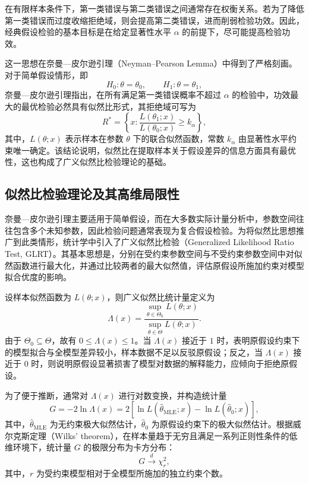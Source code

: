 \documentclass[UTF8,a4paper,12pt]{ctexbook}
\begin{document}
在有限样本条件下，第一类错误与第二类错误之间通常存在权衡关系。若为了降低第一类错误而过度收缩拒绝域，则会提高第二类错误，进而削弱检验功效。因此，经典假设检验的基本目标是在给定显著性水平 $\alpha$ 的前提下，尽可能提高检验功效。

这一思想在奈曼—皮尔逊引理（Neyman--Pearson Lemma）中得到了严格刻画。对于简单假设情形，即
\begin{equation}
H_0:\theta=\theta_0, \qquad H_1:\theta=\theta_1,
\end{equation}
奈曼—皮尔逊引理指出，在所有满足第一类错误概率不超过 $\alpha$ 的检验中，功效最大的最优检验必然具有似然比形式，其拒绝域可写为
\begin{equation}
R^*=\left\{x:\frac{L(\theta_1;x)}{L(\theta_0;x)}\geq k_{\alpha}\right\},
\end{equation}
其中，$L(\theta;x)$ 表示样本在参数 $\theta$ 下的联合似然函数，常数 $k_{\alpha}$ 由显著性水平约束唯一确定。该结论说明，似然比在提取样本关于假设差异的信息方面具有最优性，这也构成了广义似然比检验理论的基础。

\subsection{似然比检验理论及其高维局限性}

奈曼—皮尔逊引理主要适用于简单假设，而在大多数实际计量分析中，参数空间往往包含多个未知参数，因此检验问题通常表现为复合假设检验。为将似然比思想推广到此类情形，统计学中引入了广义似然比检验（Generalized Likelihood Ratio Test, GLRT）。其基本思想是，分别在受约束参数空间与不受约束参数空间中对似然函数进行最大化，并通过比较两者的最大似然值，评估原假设所施加约束对模型拟合优度的影响。

设样本似然函数为 $L(\theta;x)$，则广义似然比统计量定义为
\begin{equation}
\Lambda(x)=\frac{\sup_{\theta\in\Theta_0}L(\theta;x)}{\sup_{\theta\in\Theta}L(\theta;x)}.
\end{equation}
由于 $\Theta_0\subseteq\Theta$，故有 $0\leq \Lambda(x)\leq 1$。当 $\Lambda(x)$ 接近于 $1$ 时，表明原假设约束下的模型拟合与全模型差异较小，样本数据不足以反驳原假设；反之，当 $\Lambda(x)$ 接近于 $0$ 时，则说明原假设显著损害了模型对数据的解释能力，应倾向于拒绝原假设。

为了便于推断，通常对 $\Lambda(x)$ 进行对数变换，并构造统计量
\begin{equation}
G=-2\ln\Lambda(x)=2\left[\ln L(\hat{\theta}_{\mathrm{MLE}};x)-\ln L(\hat{\theta}_0;x)\right],
\end{equation}
其中，$\hat{\theta}_{\mathrm{MLE}}$ 为无约束极大似然估计，$\hat{\theta}_0$ 为原假设约束下的极大似然估计。根据威尔克斯定理（Wilks' theorem），在样本量趋于无穷且满足一系列正则性条件的低维环境下，统计量 $G$ 的极限分布为卡方分布：
\begin{equation}
G \xrightarrow{d} \chi_r^2,
\end{equation}
其中，$r$ 为受约束模型相对于全模型所施加的独立约束个数。
\end{document}

